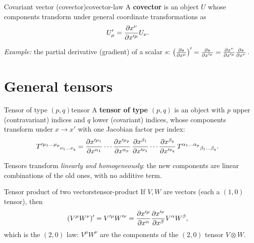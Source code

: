 \begin{definition}{Covariant vector (covector)}{covector-law}
A \textbf{covector} is an object $U$ whose components transform under general coordinate transformations as
\begin{equation}
  U'_\mu=\frac{\partial x^\nu}{\partial x'^\mu}U_\nu .
\end{equation}
\end{definition}
\textit{Example:} the partial derivative (gradient) of a scalar $s$: $\left(\frac{\partial s}{\partial x^\mu}\right)'=\frac{\partial s}{\partial x'^\mu}=\frac{\partial x^\nu}{\partial x'^\mu}\frac{\partial s}{\partial x^\nu}$.

\section{General tensors}

\begin{definition}{Tensor of type $(p,q)$}{tensor}
A \textbf{tensor of type $(p,q)$} is an object with $p$ upper (contravariant) indices and $q$ lower (covariant) indices, whose components transform under $x\to x'$ with one Jacobian factor per index:
\begin{equation}
  T'^{\mu_1\dots\mu_p}{}_{\nu_1\dots\nu_q}=
  \frac{\partial x'^{\mu_1}}{\partial x^{\alpha_1}}\cdots\frac{\partial x'^{\mu_p}}{\partial x^{\alpha_p}}\,
  \frac{\partial x^{\beta_1}}{\partial x'^{\nu_1}}\cdots\frac{\partial x^{\beta_q}}{\partial x'^{\nu_q}}\,
  T^{\alpha_1\dots\alpha_p}{}_{\beta_1\dots\beta_q}.
  \label{eq:tensor-law}
\end{equation}
\end{definition}
Tensors transform \emph{linearly and homogeneously}: the new components are linear combinations of the old ones, with no additive term.

\begin{example}{Tensor product of two vectors}{tensor-product}
If $V,W$ are vectors (each a $(1,0)$ tensor), then
\[
  (V^\mu W^\nu)'=V'^\mu W'^\nu=\frac{\partial x'^\mu}{\partial x^\alpha}\frac{\partial x'^\nu}{\partial x^\beta}V^\alpha W^\beta ,
\]
which is the $(2,0)$ law: $V^\mu W^\nu$ are the components of the $(2,0)$ tensor $V\otimes W$.
\end{example}

